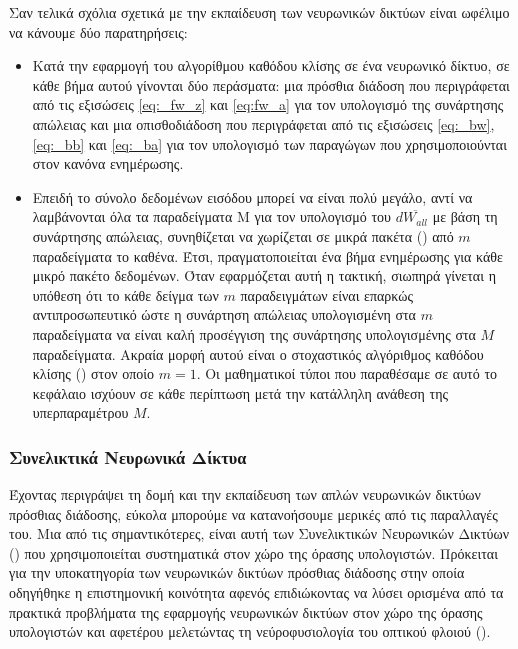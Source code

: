 Σαν τελικά σχόλια σχετικά με την εκπαίδευση των νευρωνικών δικτύων είναι ωφέλιμο να κάνουμε δύο παρατηρήσεις:
\begin{itemize}
  \item Κατά την εφαρμογή του αλγορίθμου καθόδου κλίσης σε ένα νευρωνικό δίκτυο, σε κάθε βήμα αυτού γίνονται δύο περάσματα: μια πρόσθια διάδοση που περιγράφεται από τις εξισώσεις \ref{eq:_fw_z} και \ref{eq:fw_a} για τον υπολογισμό της συνάρτησης απώλειας και μια οπισθοδιάδοση που περιγράφεται από τις εξισώσεις \ref{eq:_bw}, \ref{eq:_bb} και \ref{eq:_ba} για τον υπολογισμό των παραγώγων που χρησιμοποιούνται στον κανόνα ενημέρωσης.
  \item Επειδή το σύνολο δεδομένων εισόδου μπορεί να είναι πολύ μεγάλο, αντί να λαμβάνονται όλα τα παραδείγματα Μ για τον υπολογισμό του $d\overline{W_{all}}$ με βάση τη συνάρτησης απώλειας, συνηθίζεται να χωρίζεται σε μικρά πακέτα () από $m$ παραδείγματα το καθένα. Έτσι, πραγματοποιείται ένα βήμα ενημέρωσης για κάθε μικρό πακέτο δεδομένων. Όταν εφαρμόζεται αυτή η τακτική, σιωπηρά γίνεται η υπόθεση ότι το κάθε δείγμα των $m$ παραδειγμάτων είναι επαρκώς αντιπροσωπευτικό ώστε η συνάρτηση απώλειας υπολογισμένη στα $m$ παραδείγματα να είναι καλή προσέγγιση της συνάρτησης υπολογισμένης στα $M$ παραδείγματα. Ακραία μορφή αυτού είναι ο στοχαστικός αλγόριθμος καθόδου κλίσης () στον οποίο $m=1$. Οι μαθηματικοί τύποι που παραθέσαμε σε αυτό το κεφάλαιο ισχύουν σε κάθε περίπτωση μετά την κατάλληλη ανάθεση της υπερπαραμέτρου $M$.
\end{itemize}

\subsubsection{Συνελικτικά Νευρωνικά Δίκτυα}

Έχοντας περιγράψει τη δομή και την εκπαίδευση των απλών νευρωνικών δικτύων πρόσθιας διάδοσης, εύκολα μπορούμε να κατανοήσουμε μερικές από τις παραλλαγές του. Μια από τις σημαντικότερες, είναι αυτή των Συνελικτικών Νευρωνικών Δικτύων () που χρησιμοποιείται συστηματικά στον χώρο της όρασης υπολογιστών. Πρόκειται για την υποκατηγορία των νευρωνικών δικτύων πρόσθιας διάδοσης στην οποία οδηγήθηκε η επιστημονική κοινότητα αφενός επιδιώκοντας να λύσει ορισμένα από τα πρακτικά προβλήματα της εφαρμογής νευρωνικών δικτύων στον χώρο της όρασης υπολογιστών και αφετέρου μελετώντας τη νεύρο\textendash φυσιολογία του οπτικού φλοιού ().\par

